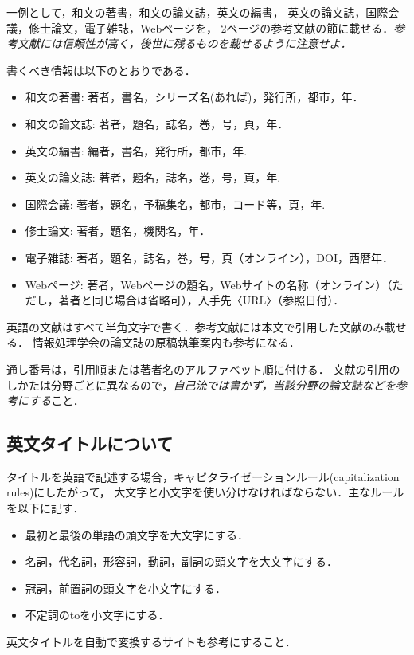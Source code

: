 \documentclass[10pt,a4paper,notitlepage,oneside,twocolumn]{abst_ltjsarticle}
\begin{document}
一例として，和文の著書\cite{suetake}，和文の論文誌\cite{kusano}，英文の編書\cite{fuortes}，
英文の論文誌\cite{rice}，国際会議\cite{guibas}，修士論文\cite{chudai}，電子雑誌\cite{iwama}，Webページ\cite{IPSJ}を，
2ページの参考文献の節に載せる．{\em 参考文献には信頼性が高く，後世に残るものを載せるように注意せよ．}

書くべき情報は以下のとおりである．
\begin{itemize}
\item 和文の著書: 著者，書名，シリーズ名(あれば)，発行所，都市，年．
\item 和文の論文誌: 著者，題名，誌名，巻，号，頁，年．
\item 英文の編書: 編者，書名，発行所，都市，年. 
\item 英文の論文誌: 著者，題名，誌名，巻，号，頁，年.
\item 国際会議: 著者，題名，予稿集名，都市，コード等，頁，年.
\item 修士論文: 著者，題名，機関名，年．
\item 電子雑誌: 著者，題名，誌名，巻，号，頁（オンライン），DOI，西暦年．
\item Webページ: 著者，Webページの題名，Webサイトの名称（オンライン）（ただし，著者と同じ場合は省略可），入手先〈URL〉（参照日付）．
\end{itemize}
英語の文献はすべて半角文字で書く．参考文献には本文で引用した文献のみ載せる．
情報処理学会の論文誌の原稿執筆案内\cite{IPSJ}も参考になる．

通し番号は，引用順または著者名のアルファベット順に付ける．
文献の引用のしかたは分野ごとに異なるので，{\em 自己流では書かず，当該分野の論文誌などを参考にする}こと．


\subsection{英文タイトルについて}

タイトルを英語で記述する場合，キャピタライゼーションルール(capitalization rules)にしたがって，
大文字と小文字を使い分けなければならない．主なルールを以下に記す．
\begin{itemize}
\item 最初と最後の単語の頭文字を大文字にする．
\item 名詞，代名詞，形容詞，動詞，副詞の頭文字を大文字にする．
\item 冠詞，前置詞の頭文字を小文字にする．
\item 不定詞のtoを小文字にする．
\end{itemize}
英文タイトルを自動で変換するサイト\cite{cap}も参考にすること．
\end{document}
